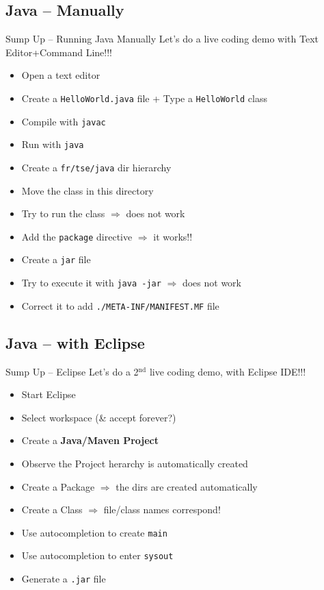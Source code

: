 \documentclass[English,c,%
hyperref={%
    pdftitle={FISA-DE2 OOP in Java},%
    pdfauthor={Muller, Gravier, Laforest, Subercaze},%
    pdfsubject={OOP in Java},%
    pdfkeywords={OOP, Java},%
    colorlinks=true,%
    urlcolor=blue,%
    linkcolor=%
    },%
xcolor={pdftex,svgnames} %
]{beamer}
\begin{document}
\subsection{Java -- Manually}

\begin{frame}{Sump Up -- Running Java Manually}
Let's do a live coding demo with Text Editor+Command Line!!!
\begin{itemize}
  \item Open a text editor
  \item Create a \texttt{HelloWorld.java} file + Type a \texttt{HelloWorld} class
  \item Compile with \texttt{javac}
  \item Run with \texttt{java}
  \medskip
  \item Create a \texttt{fr/tse/java} dir hierarchy
  \item Move the class in this directory
  \item Try to run the class $\Rightarrow$ does not work
  \item Add the \texttt{package} directive $\Rightarrow$ it works!!
  \medskip
  \item Create a \texttt{jar} file
  \item Try to execute it with \texttt{java -jar} $\Rightarrow$ does not work
  \item Correct it to add \texttt{./META-INF/MANIFEST.MF} file
\end{itemize}
\end{frame}

\subsection{Java -- with Eclipse}
\begin{frame}{Sump Up -- Eclipse}
Let's do a 2$^{\text{nd}}$ live coding demo, with Eclipse IDE!!!
\begin{itemize}
  \item Start Eclipse
  \item Select workspace (\& accept forever?)
  \item Create a \textbf{Java/Maven Project}
  \item Observe the Project herarchy is automatically created
  \medskip
  \item Create a Package $\Rightarrow$ the dirs are created automatically
  \item Create a Class $\Rightarrow$ file/class names correspond!
  \medskip
  \item Use autocompletion to create \texttt{main}
  \item Use autocompletion to enter \texttt{sysout}
  \medskip
  \item Generate a \texttt{.jar} file
\end{itemize}
\end{frame}
\end{document}
